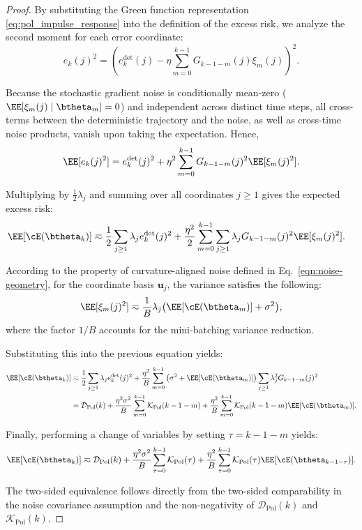 \begin{proof}

By substituting the Green function representation \eqref{eq:pol_impulse_response} into the definition of the excess risk, we analyze the second moment for each error coordinate:
\[
    e_k(j)^2
    =
    \left( e_k^{\mathrm{det}}(j)
    -\eta\sum_{m=0}^{k-1}G_{k-1-m}(j)\xi_m(j) \right)^2.
\]

Because the stochastic gradient noise is conditionally mean-zero ($\EE[\xi_m(j) \mid \btheta_m] = 0$) and independent across distinct time steps, all cross-terms between the deterministic trajectory and the noise, as well as cross-time noise products, vanish upon taking the expectation. Hence,
\[
    \EE[e_k(j)^2]
    =
    e_k^{\mathrm{det}}(j)^2
    +
    \eta^2\sum_{m=0}^{k-1}G_{k-1-m}(j)^2\EE[\xi_m(j)^2].
\]

Multiplying by $\frac{1}{2}\lambda_j$ and summing over all coordinates $j \ge 1$ gives the expected excess risk:
\begin{align*}
    \EE[\cE(\btheta_k)]
    &\eqsim
    \frac{1}{2} \sum_{j\ge1}\lambda_j e_k^{\mathrm{det}}(j)^2
    +
    \frac{\eta^2}{2}\sum_{m=0}^{k-1}\sum_{j\ge1}
    \lambda_j G_{k-1-m}(j)^2\EE[\xi_m(j)^2].
\end{align*}

According to the property of curvature-aligned noise defined in Eq.~\eqref{eqn:noise-geometry}, for the coordinate basis $\bm{u}_j$, the variance satisfies the following:
\[
    \EE[\xi_m(j)^2]
    \eqsim
    \frac{1}{B}\lambda_j\big(\EE[\cE(\btheta_m)] + \sigma^2\big),
\]
where the factor $1/B$ accounts for the mini-batching variance reduction. 

Substituting this into the previous equation yields:
\begin{align*}
    \EE[\cE(\btheta_k)]
    &\eqsim
    \frac{1}{2} \sum_{j\ge1}\lambda_j e_k^{\mathrm{det}}(j)^2
    +
    \frac{\eta^2}{B}\sum_{m=0}^{k-1}
    \big(\sigma^2+\EE[\cE(\btheta_m)]\big)
    \sum_{j\ge1}\lambda_j^2 G_{k-1-m}(j)^2  \\
    &=
    \mathcal D_{\mathrm{Pol}}(k)
    +
    \frac{\eta^2\sigma^2}{B}\sum_{m=0}^{k-1}\mathcal K_{\mathrm{Pol}}(k-1-m)
    +
    \frac{\eta^2}{B}\sum_{m=0}^{k-1}\mathcal K_{\mathrm{Pol}}(k-1-m)\EE[\cE(\btheta_m)].
\end{align*}

Finally, performing a change of variables by setting $\tau = k-1-m$ yields:
\[
    \EE[\cE(\btheta_k)]
    \eqsim
    \mathcal{D}_{\mathrm{Pol}}(k)
    +
    \frac{\eta^2\sigma^2}{B}\sum_{\tau=0}^{k-1}\mathcal{K}_{\mathrm{Pol}}(\tau)
    +
    \frac{\eta^2}{B}\sum_{\tau=0}^{k-1}\mathcal{K}_{\mathrm{Pol}}(\tau)\EE[\cE(\btheta_{k-1-\tau})].
\]

The two-sided equivalence follows directly from the two-sided comparability in the noise covariance assumption and the non-negativity of $\mathcal D_{\mathrm{Pol}}(k)$ and $\mathcal K_{\mathrm{Pol}}(k)$.
\end{proof}

